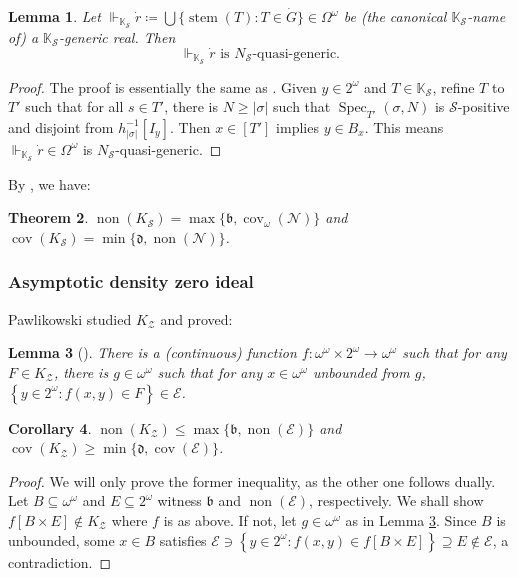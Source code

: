 \documentclass[a4paper,12pt]{amsart}
\newtheorem{thm}{Theorem}
\newtheorem{lem}[thm]{Lemma}
\newtheorem{cor}[thm]{Corollary}
\theoremstyle{definition}
\numberwithin{thm}{section}
\numberwithin{equation}{section}
\newcommand{\oo}{{\omega}^\omega}
\newcommand{\bb}{\mathfrak{b}}
\newcommand{\dd}{\mathfrak{d}}
\DeclareMathOperator{\non}{non}
\DeclareMathOperator{\cov}{cov}
\newcommand{\forces}{\Vdash}
\newcommand{\none}{\non(\mathcal{E})}
\newcommand{\cove}{\cov(\mathcal{E})}
\newcommand{\set}[2]
{\left\{{#1}:{#2}\right\}}  %
\newcommand{\Z}{\mathcal{Z}}
\DeclareMathOperator{\stem}{stem}
\DeclareMathOperator{\Spec}{Spec}
\newcommand{\Solecki}{\mathcal{S}}
\newcommand{\KS}{\mathbb{K}_{\Solecki}}
\begin{document}
    \begin{lem}
        Let $\forces_{\KS}\dot{r}\coloneqq\bigcup\{\stem(T):T\in\dot{G}\}\in\Omega^\omega$ be (the canonical $\KS$-name of) a $\KS$-generic real. Then
        \[
        \forces_{\KS}\dot{r}\text{ is $N_\Solecki$-quasi-generic.}
        \]
    \end{lem}
    \begin{proof} 
        The proof is essentially the same as .
        Given $y\in2^\omega$ and $T\in\KS$, refine $T$ to $T'$ such that for all $s \in T'$, there is $N\geq\lvert\sigma\rvert$ such that $\Spec_{T'}(\sigma, N)$ is $\Solecki$-positive and disjoint from $h_{\lvert\sigma\rvert}^{-1}[I_y]$. Then $x \in [T']$ implies $y \in B_x$. This means $\forces_{\KS}\dot{r}\in\Omega^\omega$ is $N_\Solecki$-quasi-generic.
    \end{proof}

    By , we have:
    \begin{thm}\label{thm:K_S_exact}
        $\non(K_\mathcal{S}) = \max\{\mathfrak{b}, \cov_\omega(\mathcal{N})\}$ and $\cov(K_\mathcal{S}) = \min\{\mathfrak{d}, \non(\mathcal{N})\}$.
    \end{thm}


    \subsubsection{Asymptotic density zero ideal}

    Pawlikowski \cite{Paw00} studied $K_\Z$ and proved:
    
    \begin{lem}[{\cite[Lemma 2.3]{Paw00}}]
    	\label{lem:paw00_max}
    	There is a (continuous) function $f\colon \oo\times2^\omega\to\oo$ such that for any $F\in K_\Z$, there is $g\in\oo$ such that for any $x\in\oo$ unbounded from $g$, $\set{y\in2^\omega}{f(x,y)\in F}\in\mathcal{E}$. 
    \end{lem}
        
    \begin{cor}\label{cor:paw00_ineq}
    	$\non(K_\Z)\leq\max\{\bb,\none\}$ and $\cov(K_\Z)\geq\min\{\dd,\cove\}$.
    \end{cor}
    \begin{proof}
        We will only prove the former inequality, as the other one follows dually. Let $B\subseteq\oo$ and $E\subseteq2^\omega$ witness $\bb$ and $\none$, respectively. We shall show $f[B\times E]\notin K_\Z$ where $f$ is as above. If not, let $g\in\oo$ as in Lemma \ref{lem:paw00_max}. Since $B$ is unbounded, some $x\in B$ satisfies $\mathcal{E}\ni \set{y\in2^\omega}{f(x,y)\in f[B\times E]}\supseteq E\notin \mathcal{E}$, a contradiction. 
    \end{proof}
\end{document}

